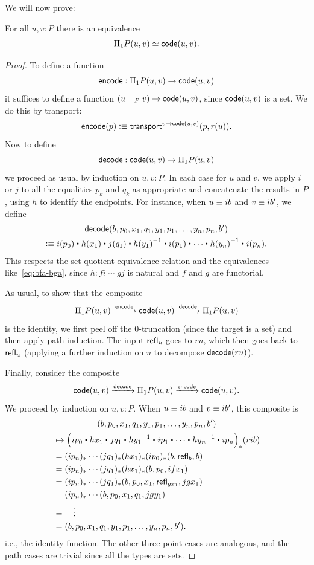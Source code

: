 We will now prove:
\begin{thm}
  For all $u,v:P$ there is an equivalence
  \[ \Pi_1P(u,v) \simeq \mathsf{code}(u,v). \]
\end{thm}
\begin{proof}

To define a function
\[ \mathsf{encode} : \Pi_1P(u,v) \to \mathsf{code}(u,v) \]
it suffices to define a function $(u=_P v) \to \mathsf{code}(u,v) $,
since $\mathsf{code}(u,v)$ is a set.
We do this by transport:
\[\mathsf{encode}(p) \vcentcolon\equiv \mathsf{transport}^{v\mapsto \mathsf{code}(u,v)}(p,r(u)).\]
Now to define
\[ \mathsf{decode}: \mathsf{code}(u,v) \to \Pi_1P(u,v) \]
we proceed as usual by induction on $u,v:P$.
In each case for $u$ and $v$, we apply $i$ or $j$ to all the equalities $p_k$ and $q_k$ as appropriate and concatenate the results in $P$, using $h$ to identify the endpoints.
For instance, when $u\equiv ib$ and $v\equiv ib'$, we define
\begin{multline}\label{eq:decode}
 \decode(b, p_0, x_1, q_1, y_1, p_1, \dots, y_n, p_n, b')\\
 \defeq i(p_0)\ct h(x_1) \ct j(q_1) \ct \opp{h(y_1)} \ct i(p_1) \ct \cdots \ct \opp{h(y_n)}\ct i(p_n).
\end{multline}
This respects the set-quotient equivalence relation and the equivalences like~\eqref{eq:bfa-bga}, since $h: fi \sim gj$ is natural and $f$ and $g$ are functorial.

As usual, to show that the composite
\[ \Pi_1P(u,v) \xrightarrow{\mathsf{encode}} \mathsf{code}(u,v) \xrightarrow{\mathsf{decode}} \Pi_1P(u,v) \]
is the identity, we first peel off the 0-truncation (since the target is a set) and then apply path-induction.
The input $\mathsf{refl}_{u}$ goes to $ru$, which then goes back to $\mathsf{refl}_{u}$ (applying a further induction on $u$ to decompose $\mathsf{decode}(ru)$).

Finally, consider the composite
\[  \mathsf{code}(u,v) \xrightarrow{\mathsf{decode}} \Pi_1P(u,v) \xrightarrow{\mathsf{encode}} \mathsf{code}(u,v). \]
We proceed by induction on $u,v:P$.
When $u\equiv ib$ and $v\equiv ib'$, this composite is
\begin{multline*}
(b, p_0, x_1, q_1, y_1, p_1, \dots, y_n, p_n, b')\\
\begin{split}
  &\mapsto \Big(ip_0\ct hx_1 \ct jq_1 \ct \opp{hy_1} \ct ip_1 \ct \cdots \ct \opp{hy_n}\ct ip_n\Big)_*(rib)\\
  &= (ip_n)_* \cdots(jq_1)_* (hx_1)_*(ip_0)_*(b,\refl{b},b)\\
  &= (ip_n)_* \cdots(jq_1)_* (hx_1)_*(b,p_0,ifx_1)\\
  &= (ip_n)_* \cdots(jq_1)_* (b,p_0,x_1,\refl{gx_1},jgx_1)\\
  &= (ip_n)_* \cdots (b,p_0,x_1,q_1,jgy_1)\\
  &= \quad\vdots\\
  &= (b, p_0, x_1, q_1, y_1, p_1, \dots, y_n, p_n, b').
\end{split}
\end{multline*}
i.e., the identity function.
The other three point cases are analogous, and the path cases are trivial since all the types are sets.
\end{proof}

